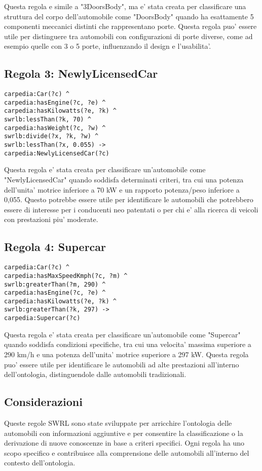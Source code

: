 Questa regola e simile a "3DoorsBody", ma e' stata creata per classificare una struttura del corpo dell'automobile
come "DoorsBody" quando ha esattamente 5 componenti meccanici distinti che rappresentano porte.
Questa regola puo' essere utile per distinguere tra automobili con configurazioni di porte diverse,
come ad esempio quelle con 3 o 5 porte, influenzando il design e l'usabilita'.

\subsection{Regola 3: NewlyLicensedCar}

\begin{verbatim}
carpedia:Car(?c) ^
carpedia:hasEngine(?c, ?e) ^
carpedia:hasKilowatts(?e, ?k) ^
swrlb:lessThan(?k, 70) ^
carpedia:hasWeight(?c, ?w) ^
swrlb:divide(?x, ?k, ?w) ^
swrlb:lessThan(?x, 0.055) ->
carpedia:NewlyLicensedCar(?c)
\end{verbatim}


Questa regola e' stata creata per classificare un'automobile come "NewlyLicensedCar" quando soddisfa
determinati criteri, tra cui una potenza dell'unita' motrice inferiore a 70 kW e un rapporto potenza/peso
inferiore a 0,055.
Questo potrebbe essere utile per identificare le automobili che potrebbero essere di interesse per i conducenti
neo patentati o per chi e' alla ricerca di veicoli con prestazioni piu' moderate.

\subsection{Regola 4: Supercar}

\begin{verbatim}
carpedia:Car(?c) ^
carpedia:hasMaxSpeedKmph(?c, ?m) ^
swrlb:greaterThan(?m, 290) ^
carpedia:hasEngine(?c, ?e) ^
carpedia:hasKilowatts(?e, ?k) ^
swrlb:greaterThan(?k, 297) ->
carpedia:Supercar(?c)
\end{verbatim}


Questa regola e' stata creata per classificare un'automobile come "Supercar" quando soddisfa condizioni
specifiche, tra cui una velocita' massima superiore a 290 km/h e una potenza dell'unita' motrice superiore a 297 kW.
Questa regola puo' essere utile per identificare le automobili ad alte prestazioni all'interno dell'ontologia,
distinguendole dalle automobili tradizionali.

\subsection{Considerazioni}
Queste regole SWRL sono state sviluppate per arricchire l'ontologia delle automobili con informazioni
aggiuntive e per consentire la classificazione o la derivazione di nuove conoscenze in base a criteri specifici.
Ogni regola ha uno scopo specifico e contribuisce alla comprensione delle automobili all'interno del contesto
dell'ontologia.


